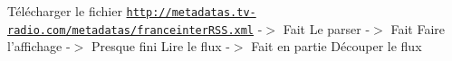 Télécharger le fichier \href{http://metadatas.tv-radio.com/metadatas/franceinterRSS.xml}{\tt http://metadatas.tv-\/radio.com/metadatas/franceinterRSS.xml} -\/$>$ Fait Le parser -\/$>$ Fait Faire l'affichage -\/$>$ Presque fini Lire le flux -\/$>$ Fait en partie Découper le flux 